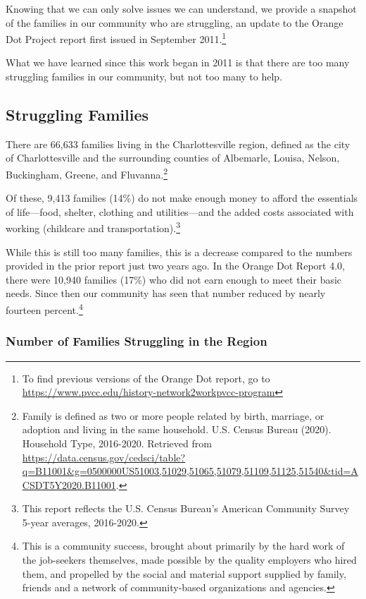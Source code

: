 \documentclass[
]{article}
\begin{document}
Knowing that we can only solve issues we can understand, we provide a
snapshot of the families in our community who are struggling, an update
to the Orange Dot Project report first issued in September
2011.\footnote{To find previous versions of the Orange Dot report, go to
  \url{https://www.pvcc.edu/history-network2workpvcc-program}}

What we have learned since this work began in 2011 is that there are too
many struggling families in our community, but not too many to help.

\hypertarget{struggling-families}{%
\subsection{Struggling Families}\label{struggling-families}}

There are 66,633 families living in the Charlottesville region, defined
as the city of Charlottesville and the surrounding counties of
Albemarle, Louisa, Nelson, Buckingham, Greene, and Fluvanna.\footnote{Family
  is defined as two or more people related by birth, marriage, or
  adoption and living in the same household. U.S. Census Bureau (2020).
  Household Type, 2016-2020. Retrieved from
  \url{https://data.census.gov/cedsci/table?q=B11001\&g=0500000US51003,51029,51065,51079,51109,51125,51540\&tid=ACSDT5Y2020.B11001}.}

Of these, 9,413 families (14\%) do not make enough money to afford the
essentials of life---food, shelter, clothing and utilities---and the
added costs associated with working (childcare and
transportation).\footnote{This report reflects the U.S. Census Bureau's
  American Community Survey 5-year averages, 2016-2020.}

While this is still too many families, this is a decrease compared to
the numbers provided in the prior report just two years ago. In the
Orange Dot Report 4.0, there were 10,940 families (17\%) who did not
earn enough to meet their basic needs. Since then our community has seen
that number reduced by nearly fourteen percent.\footnote{This is a
  community success, brought about primarily by the hard work of the
  job-seekers themselves, made possible by the quality employers who
  hired them, and propelled by the social and material support supplied
  by family, friends and a network of community-based organizations and
  agencies.}

\hypertarget{number-of-families-struggling-in-the-region}{%
\subsubsection{Number of Families Struggling in the
Region}\label{number-of-families-struggling-in-the-region}}
\end{document}
